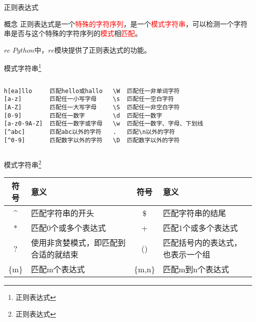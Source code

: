 \documentclass{beamer}
\begin{document}
\begin{frame}{正则表达式}
\begin{block}{概念}
正则表达式是一个\textcolor{red}{特殊的字符序列}，是一个\textcolor{red}{模式字符串}，可以检测一个字符串是否与这个特殊的字符序列的\textcolor{red}{模式}相\textcolor{red}{匹配}。
\end{block}
\begin{block}{$re$}
$Python$中，$re$模块提供了正则表达式的功能。
\end{block}
\end{frame}
\begin{frame}[fragile]{模式字符串\footnote{正则表达式}}
\small{
\begin{columns}
\begin{Verbatim}[numbers=none,frame=none,rulecolor=\color{red}]
h[ea]llo     匹配hello或hallo
[a-z]        匹配任一小写字母
[A-Z]        匹配任一大写字母
[0-9]        匹配任一数字
[a-z0-9A-Z]  匹配任一数字或字母
[^abc]       匹配abc以外的字符
[^0-9]       匹配数字以外的字符
\end{Verbatim}

\begin{Verbatim}[numbers=none,frame=none,rulecolor=\color{red}]
\W  匹配任一非单词字符
\s  匹配任一空白字符
\S  匹配任一非空白字符
\d  匹配任一数字
\w  匹配任一数字、字母、下划线
.   匹配\n以外的字符
\D  匹配数字以外的字符
\end{Verbatim}
\end{columns}
}
\end{frame}

\begin{frame}[fragile]{模式字符串\footnote{正则表达式}}
\small{
\begin{table}
\begin{tabular}{cp{10em}cp{10em}}
\toprule
\textbf{符号}&\textbf{意义}&\textbf{符号}&\textbf{意义}\\
\midrule
\^&匹配字符串的开头&\$&匹配字符串的结尾\\
*&匹配0个或多个表达式&+&匹配1个或多个表达式\\
?&使用非贪婪模式，即匹配到合适的就结束&()&匹配括号内的表达式，也表示一个组\\
\{m\}&匹配m个表达式&\{m,n\}&匹配m到n个表达式\\

\bottomrule
\end{tabular}
\end{table}
}
\end{frame}
\end{document}
